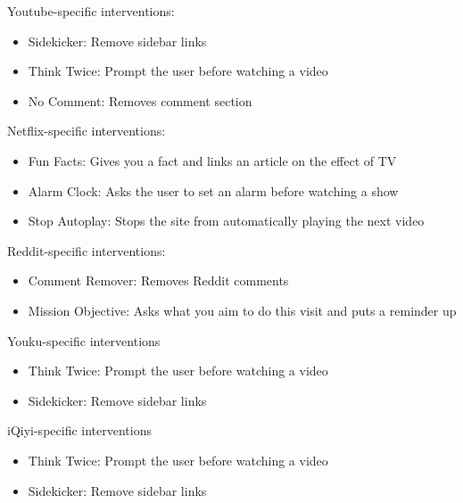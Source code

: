 \vspace{2mm}

Youtube-specific interventions:

\begin{itemize}
    \item Sidekicker: Remove sidebar links
    \item Think Twice: Prompt the user before watching a video
    \item No Comment: Removes comment section
\end{itemize}

\vspace{2mm}

Netflix-specific interventions:

\begin{itemize}
    \item Fun Facts: Gives you a fact and links an article on the effect of TV
    \item Alarm Clock: Asks the user to set an alarm before watching a show
    \item Stop Autoplay: Stops the site from automatically playing the next video
\end{itemize}

\vspace{2mm}

Reddit-specific interventions:

\begin{itemize}
    \item Comment Remover: Removes Reddit comments
    \item Mission Objective: Asks what you aim to do this visit and puts a reminder up
\end{itemize}

\vspace{2mm}

Youku-specific interventions

\begin{itemize}
    \item Think Twice: Prompt the user before watching a video
    \item Sidekicker: Remove sidebar links
\end{itemize}

\vspace{2mm}

iQiyi-specific interventions

\begin{itemize}
    \item Think Twice: Prompt the user before watching a video
    \item Sidekicker: Remove sidebar links
\end{itemize}

